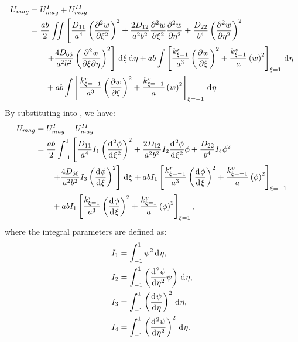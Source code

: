 \documentclass[preprint,12pt]{elsarticle}
\newcommand{\id}{\mathrm{d}\mkern1mu}
\begin{document}
\begin{equation}\label{eq:poten_energy_tolx}
	\begin{split}
		U_{mag} &= U^{I}_{mag} + U^{II}_{mag} \\
		&= \frac{ab}{2} \iint \left[ \frac{D_{11}}{a^4} \left( \frac{\partial^2 w}{\partial \xi^2} \right)^2 + \frac{2 D_{12}}{a^2 b^2} \frac{\partial^2 w}{\partial \xi^2} \frac{\partial^2 w}{\partial \eta^2} + \frac{D_{22}}{b^4} \left( \frac{\partial^2 w}{\partial \eta^2} \right)^2 \right. \\
		&\qquad \left.  + \frac{4 D_{66}}{a^2 b^2} \left( \frac{\partial^2 w}{\partial \xi \partial \eta} \right)^2 \right] \, \id\xi \, \id\eta + ab \int \left[\frac{k^r_{\xi=1}}{a^3} \left( \frac{\partial w}{\partial \xi} \right)^2 + \frac{k^v_{\xi=1}}{a} \left( w \right)^2 \right]_{\xi=1} \, \id \eta \\
		&\qquad  + ab \int \left[\frac{k^r_{\xi=-1}}{a^3} \left( \frac{\partial w}{\partial \xi} \right)^2 + \frac{k^v_{\xi=-1}}{a} \left( w \right)^2 \right]_{\xi=-1} \, \id \eta
	\end{split}
\end{equation}
%
By substituting  into , we have:
%
\begin{equation}\label{eq:poten_energy_tolx2}
	\begin{split}
		U_{mag}&=U^{I}_{mag}+U^{II}_{mag}\\
		&=\frac{ab}{2} \int_{-1}^{1} \left[ \frac{D_{11}}{a^4}I_1 \left( \frac{\id^2\phi }{\id \xi^2} \right)^2 + \frac{2 D_{12}}{a^2 b^2}I_2 \frac{\id^2\phi }{\id \xi^2}\phi  + \frac{D_{22}}{b^4}I_4  \phi^2 \right. \\
		&\qquad \left. + \frac{4 D_{66}}{a^2 b^2}I_3 \left( \frac{\id \phi }{\id \xi}\right)^2 \right] \, \id\xi +abI_1 \left[\frac{k^r_{\xi=-1}}{a^3} \left( \frac{\id \phi}{\id \xi} \right)^2+ \frac{k^v_{\xi=-1}}{a} \left( \phi \right)^2\right]_{\xi=-1}\\
		&\qquad+abI_1 \left[\frac{k^r_{\xi=1}}{a^3} \left( \frac{\id \phi}{\id \xi} \right)^2+ \frac{k^v_{\xi=1}}{a} \left( \phi \right)^2\right]_{\xi=1},
	\end{split}
\end{equation}
%
where the integral parameters are defined as:
%
\begin{equation}\label{eq:inte_phi_text}  
	\begin{split}  
		&I_1 = \int_{-1}^{1} \psi^2 \, \id\eta, \\  
		&I_2 = \int_{-1}^{1} \left( \frac{\id^2 \psi}{\id \eta^2} \psi \right) \, \id\eta, \\  
		&I_3 = \int_{-1}^{1} \left( \frac{\id \psi}{\id \eta} \right)^2 \, \id\eta, \\  
		&I_4 = \int_{-1}^{1} \left( \frac{\id^2 \psi}{\id \eta^2} \right)^2 \, \id\eta.  
	\end{split}  
\end{equation}   
\end{document}
